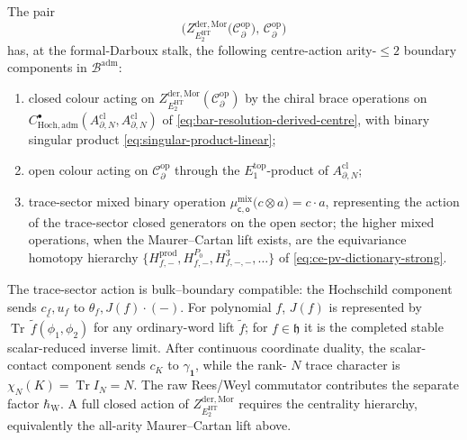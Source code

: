 \begin{thm}
The pair
\begin{equation}\label{eq:sc-ht-action-on-pair}
  \bigl(Z^{\mathrm{der},\mathrm{Mor}}_{E_2^{\mathrm{HT}}}\!\bigl(
	    \mathcal C^{\mathrm{op}}_\partial\bigr),\,
	    \mathcal C^{\mathrm{op}}_\partial\bigr)
\end{equation}
has, at the formal-Darboux stalk, the following centre-action
arity-\(\le2\) boundary components in \(\mathcal B^{\mathrm{adm}}\):
\begin{enumerate}[label=\textup{(\roman*)}]
  \item closed colour acting on
        \(Z^{\mathrm{der},\mathrm{Mor}}_{E_2^{\mathrm{HT}}}(
        \mathcal C^{\mathrm{op}}_\partial)\) by the chiral brace
        operations on
        \(C^\bullet_{\mathrm{Hoch},\mathrm{adm}}(A^{\mathrm{cl}}_{\partial,N},
        A^{\mathrm{cl}}_{\partial,N})\) of
        \eqref{eq:bar-resolution-derived-centre}, with binary singular
        product \eqref{eq:singular-product-linear};
  \item open colour acting on \(\mathcal C^{\mathrm{op}}_\partial\)
        through the \(E_1^{\mathrm{top}}\)-product of
        \(A^{\mathrm{cl}}_{\partial,N}\);
  \item trace-sector mixed binary operation
        \(\mu^{\mathrm{mix}}_{\mathsf c,\mathsf o}\bigl(c\otimes a\bigr)
        =c\cdot a\), representing the action of the trace-sector closed
        generators on the open sector; the higher mixed operations,
        when the Maurer--Cartan lift exists, are the equivariance
        homotopy hierarchy
        \(\{H^{\mathrm{prod}}_{f,-},H^{P_0}_{f,-},H^3_{f,-,-},\ldots\}\)
        of \eqref{eq:ce-pv-dictionary-strong}.
\end{enumerate}
The trace-sector action is bulk--boundary compatible: the Hochschild
component sends \(c_f,u_f\) to \(\theta_f,J(f)\cdot(-)\).  For
polynomial \(f\), \(J(f)\) is represented by
\(\overline{\operatorname{Tr}\,\tilde f(\phi_1,\phi_2)}\) for any
ordinary-word lift \(\tilde f\); for \(f\in\mathfrak h\) it is the
completed stable scalar-reduced inverse limit.
After continuous coordinate duality, the scalar-contact component sends
\(c_K\) to \(\gamma_{\mathbf 1}\), while the rank-
\(N\) trace character is \(\chi_N(K)=\operatorname{Tr}I_N=N\).
The raw Rees/Weyl commutator contributes the separate factor
\(\hbar_{\mathrm W}\).  A full
closed action of
\(Z^{\mathrm{der},\mathrm{Mor}}_{E_2^{\mathrm{HT}}}\) requires the
centrality hierarchy, equivalently the all-arity Maurer--Cartan lift
above.


\end{thm}
